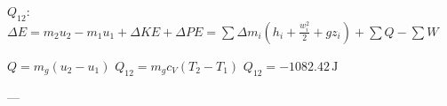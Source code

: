 \( Q_{12} \):  
\( \Delta E = m_2 u_2 - m_1 u_1 + \Delta KE + \Delta PE = \sum \Delta m_i (h_i + \frac{w_i^2}{2} + g z_i) + \sum Q - \sum W \)  

\( Q = m_g (u_2 - u_1) \)  
\( Q_{12} = m_g c_V (T_2 - T_1) \)  
\( Q_{12} = -1082.42 \, \text{J} \)  

---
